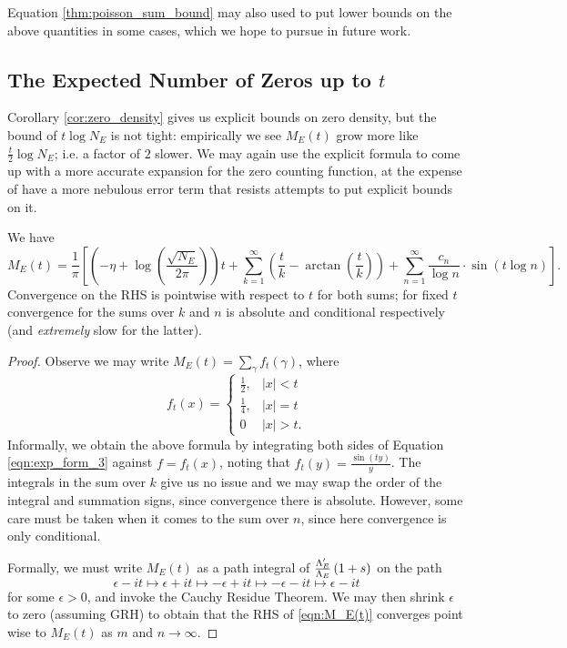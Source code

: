 Equation \ref{thm:poisson_sum_bound} may also used to put lower bounds on the above quantities in some cases, which we hope to pursue in future work.

\newpage
\subsection{The Expected Number of Zeros up to $t$}

Corollary \ref{cor:zero_density} gives us explicit bounds on zero density, but the bound of $t \log N_E$ is not tight: empirically we see $M_E(t)$ grow more like $\frac{t}{2}\log N_E$; i.e. a factor of $2$ slower. We may again use the explicit formula to come up with a more accurate expansion for the zero counting function, at the expense of have a more nebulous error term that resists attempts to put explicit bounds on it.

\begin{proposition}[GRH]
We have
\begin{equation}\label{eqn:M_E(t)}
M_E(t) = \frac{1}{\pi}\left[\left(-\eta+\log\left(\frac{\sqrt{N_E}}{2\pi}\right)\right) t + \sum_{k=1}^{\infty} \left(\frac{t}{k} - \arctan\left(\frac{t}{k}\right)\right) + \sum_{n=1}^{\infty} \frac{c_n}{\log n}\cdot \sin(t\log n)\right].
\end{equation}
Convergence on the RHS is pointwise with respect to $t$ for both sums; for fixed $t$ convergence for the sums over $k$ and $n$ is absolute and conditional respectively (and {\it extremely} slow for the latter).
\end{proposition}

\begin{proof}
Observe we may write $M_E(t) = \sum_{\gamma}f_t(\gamma)$, where
\begin{equation}
f_t(x) = \begin{cases} \frac{1}{2}, & |x|<t \\ \frac{1}{4}, & |x| = t \\ 0 & |x|> t. \end{cases}
\end{equation}
Informally, we obtain the above formula by integrating both sides of Equation \ref{eqn:exp_form_3} against $f = f_t(x)$, noting that $\hat{f}_t(y) = \frac{\sin(ty)}{y}$. The integrals in the sum over $k$ give us no issue and we may swap the order of the integral and summation signs, since convergence there is absolute. However, some care must be taken when it comes to the sum over $n$, since here convergence is only conditional. 

Formally, we must write $M_E(t)$ as a path integral of $\frac{\Lambda_E^{\prime}}{\Lambda_E}\left(1+s\right)$ on the path
\begin{equation*}
\epsilon-it \mapsto \epsilon+it \mapsto -\epsilon+it \mapsto -\epsilon-it \mapsto \epsilon-it
\end{equation*}
for some $\epsilon>0$, and invoke the Cauchy Residue Theorem. We may then shrink $\epsilon$ to zero (assuming GRH) to obtain that the RHS of \ref{eqn:M_E(t)} converges point wise to $M_E(t)$ as $m$ and $n \to \infty$.
\end{proof}

